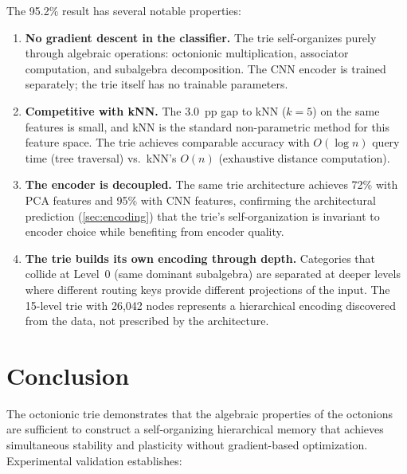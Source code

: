 \documentclass[11pt,a4paper]{article}
\theoremstyle{definition}
\theoremstyle{remark}
\begin{document}
The 95.2\% result has several notable properties:

\begin{enumerate}[nosep]
  \item \textbf{No gradient descent in the classifier.} The trie self-organizes purely through algebraic operations: octonionic multiplication, associator computation, and subalgebra decomposition. The CNN encoder is trained separately; the trie itself has no trainable parameters.

  \item \textbf{Competitive with kNN.} The 3.0~pp gap to kNN ($k{=}5$) on the same features is small, and kNN is the standard non-parametric method for this feature space. The trie achieves comparable accuracy with $O(\log n)$ query time (tree traversal) vs.\ kNN's $O(n)$ (exhaustive distance computation).

  \item \textbf{The encoder is decoupled.} The same trie architecture achieves 72\% with PCA features and 95\% with CNN features, confirming the architectural prediction (\cref{sec:encoding}) that the trie's self-organization is invariant to encoder choice while benefiting from encoder quality.

  \item \textbf{The trie builds its own encoding through depth.} Categories that collide at Level~0 (same dominant subalgebra) are separated at deeper levels where different routing keys provide different projections of the input. The 15-level trie with 26,042 nodes represents a hierarchical encoding discovered from the data, not prescribed by the architecture.
\end{enumerate}

\section{Conclusion}
\label{sec:conclusion}

The octonionic trie demonstrates that the algebraic properties of the octonions are sufficient to construct a self-organizing hierarchical memory that achieves simultaneous stability and plasticity without gradient-based optimization. Experimental validation establishes:
\end{document}
